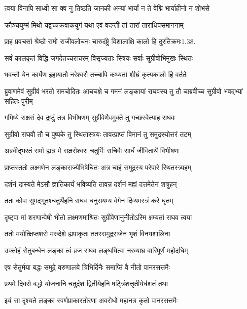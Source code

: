 \twolineshloka
{त्वया विनापि साध्वी सा क्व नु तिष्ठति जानकी}
{अन्यां भार्यां न ते वेद्मि भार्याहीनो न शोभसे}%

\twolineshloka
{क्रौञ्चयुग्मं मिथो यद्वच्चक्रवाकयुगं यथा}
{एवं वदन्तीं तां तारां ताराधिपसमाननाम्}%

\twolineshloka
{प्राह प्रवचसां श्रेष्ठो रामो राजीवलोचनः}
{चारुदंष्ट्रे विशालाक्षि कालो हि दुरतिक्रमः1.38.}%

\twolineshloka
{सर्वं कालकृतं विद्धि जगदेतच्चराचरम्}
{विसृज्यताः स्त्रियः सर्वाः सुग्रीवोभिमुखः स्थितः}%


\twolineshloka
{भवन्तौ येन कार्येण इहायातौ नरेश्वरौ}
{तच्चापि कथ्यतां शीघ्रं कृत्यकालो हि वर्तते}%


\threelineshloka
{ब्रुवाणमेवं सुग्रीवं भरतो रामचोदितः}
{आचचक्षे च गमनं लङ्कायां राघवस्य तु}
{तौ चाब्रवीच्च सुग्रीवो भवद्भ्यां सहितः पुरीम्}%

\twolineshloka
{गमिष्ये राक्षसं देव द्रष्टुं तत्र विभीषणम्}
{सुग्रीवेणैवमुक्ते तु गच्छस्वेत्याह राघवः}%

\twolineshloka
{सुग्रीवो राघवौ तौ च पुष्पके तु स्थितास्त्रयः}
{तावत्प्राप्तं विमानं तु समुद्रस्योत्तरं तटम्}%

\twolineshloka
{अब्रवीद्भरतं रामो ह्यत्र मे राक्षसेश्वरः}
{चतुर्भिः सचिवैः सार्धं जीवितार्थे विभीषणः}%

\twolineshloka
{प्राप्तस्ततो लक्ष्मणेन लङ्काराज्येभिषेचितः}
{अत्र चाहं समुद्रस्य परेपारे स्थितस्त्र्यहम्}%

\twolineshloka
{दर्शनं दास्यते मेऽसौ ज्ञातिकार्यं भविष्यति}
{तावन्न दर्शनं मह्यं दत्तमेतेन शत्रुहन्}%

\twolineshloka
{ततः कोपः सुमद्भूतश्चतुर्थेहनि राघव}
{धनुरायम्य वेगेन दिव्यमस्त्रं करे धृतम्}%

\twolineshloka
{दृष्ट्वा मां शरणान्वेषी भीतो लक्ष्मणमाश्रितः}
{सुग्रीवेणानुनीतोऽस्मि क्षम्यतां राघव त्वया}%

\twolineshloka
{ततो मयोत्क्षिप्तशरो मरुदेशे ह्यपाकृतः}
{ततस्समुद्रराजेन भृशं विनयशालिना}%

\twolineshloka
{उक्तोहं सेतुबन्धेन लङ्कां त्वं व्रज राघव}
{लङ्घयित्वा नरव्याघ्र वारिपूर्णं महोदधिम्}%

\twolineshloka
{एष सेतुर्मया बद्धः समुद्रे वरुणालये}
{त्रिभिर्दिनैः समाप्तिं वै नीतो वानरसत्तमैः}%

\twolineshloka
{प्रथमे दिवसे बद्धो योजनानि चतुर्दश}
{द्वितीयेहनि षट्त्रिंशत्तृतीयेर्धशतं तथा}%

\twolineshloka
{इयं सा दृश्यते लङ्का स्वर्णप्राकारतोरणा}
{अवरोधो महानत्र कृतो वानरसत्तमैः}%

